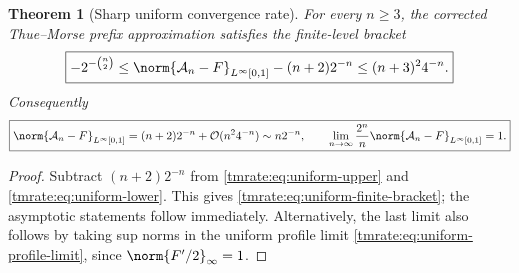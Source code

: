 \documentclass[11pt,oneside]{article}
\newtheorem{theorem}{Theorem}[section]
\theoremstyle{definition}
\theoremstyle{remark}
\newcommand{\bigO}{\mathcal O}
\begin{document}
\begin{theorem}[Sharp uniform convergence rate]
\label{tmrate:thm:uniform-rate}
For every $n\ge3$, the corrected Thue--Morse prefix approximation satisfies the
finite-level bracket
\begin{equation}
 \boxed{\displaystyle
 -2^{-\binom n2}
 \le \norm{\mathcal A_n-F}_{L^\infty[0,1]}-(n+2)2^{-n}
 \le (n+3)^2 4^{-n}.}                                      \label{tmrate:eq:uniform-finite-bracket}
\end{equation}
Consequently
\begin{equation}
 \boxed{\displaystyle
 \norm{\mathcal A_n-F}_{L^\infty[0,1]}
 =(n+2)2^{-n}+\bigO(n^2 4^{-n})
 \sim n2^{-n},
 \qquad
 \lim_{n\to\infty}\frac{2^n}{n}
 \norm{\mathcal A_n-F}_{L^\infty[0,1]}=1.}                \label{tmrate:eq:uniform-rate}
\end{equation}
\end{theorem}

\begin{proof}
Subtract $(n+2)2^{-n}$ from \eqref{tmrate:eq:uniform-upper} and
\eqref{tmrate:eq:uniform-lower}.  This gives \eqref{tmrate:eq:uniform-finite-bracket}; the
asymptotic statements follow immediately.  Alternatively, the last limit also
follows by taking sup norms in the uniform profile limit
\eqref{tmrate:eq:uniform-profile-limit}, since $\norm{F'/2}_\infty=1$.
\end{proof}
\end{document}
